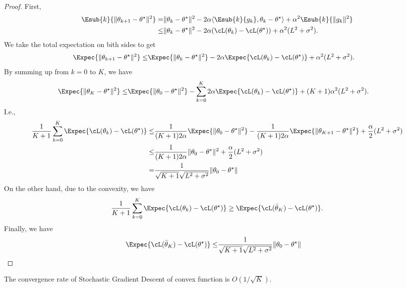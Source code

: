 \documentclass{article}
\begin{document}
\begin{proof}
    First,
    \begin{align}
        \Esub{k}{\|\theta_{k+1}-\theta^\star\|^2} 
        =& \|\theta_k - \theta^\star\|^2 - 2\alpha \langle \Esub{k}{g_k}, \theta_k-\theta^\star\rangle + \alpha^2 \Esub{k}{\|g_k\|^2}\\
        \leq& \|\theta_k - \theta^\star\|^2 - 2\alpha (\cL(\theta_k) - \cL(\theta^\star)) + \alpha^2 (L^2+\sigma^2).
    \end{align}
    We take the total expectation on bith sides to get
    \begin{align}
        \Expec{\|\theta_{k+1}-\theta^\star\|^2} 
        \leq& \Expec{\|\theta_k - \theta^\star\|^2} - 2\alpha \Expec{\cL(\theta_k) - \cL(\theta^\star)} + \alpha^2 (L^2+\sigma^2).
    \end{align}
    By summing up from $k=0$ to $K$, we have
    \begin{align}
        \Expec{\|\theta_{K}-\theta^\star\|^2} 
        \leq& \Expec{\|\theta_0 - \theta^\star\|^2} - \sum_{k=0}^{K} 2\alpha \Expec{\cL(\theta_k) - \cL(\theta^\star)} + (K+1)\alpha^2 (L^2+\sigma^2).
    \end{align}
    I.e.,
    \begin{align}
    \frac{1}{K+1} \sum_{k=0}^{K}  \Expec{\cL(\theta_k) - \cL(\theta^\star)} 
\leq& \frac{1}{(K+1)2\alpha}\Expec{\|\theta_0 - \theta^\star\|^2} -\frac{1}{(K+1)2\alpha}\Expec{\|\theta_{K+1}-\theta^\star\|^2} 
+ \frac{\alpha}{2} (L^2+\sigma^2)\\
\leq& \frac{1}{(K+1)2\alpha}\|\theta_0 - \theta^\star\|^2 + \frac{\alpha}{2} (L^2+\sigma^2)\\
=& \frac{1}{\sqrt{K+1}\sqrt{L^2+\sigma^2}}\|\theta_0 - \theta^\star\|
    \end{align}
    On the other hand, due to the convexity, we have
    \begin{align}
    \frac{1}{K+1} \sum_{k=0}^{K}  \Expec{\cL(\theta_k) - \cL(\theta^\star)} 
    \geq 
    \Expec{\cL(\bar{\theta}_K) - \cL(\theta^\star)}.
    \end{align}
    Finally, we have
    \begin{align}
    \Expec{\cL(\bar{\theta}_K) - \cL(\theta^\star)}
\leq& \frac{1}{\sqrt{K+1}\sqrt{L^2+\sigma^2}}\|\theta_0 - \theta^\star\|
    \end{align}
\end{proof}

\begin{remark}
The convergence rate of Stochastic Gradient Descent of convex function is $O(1/\sqrt{K})$.
\end{remark}
\end{document}
